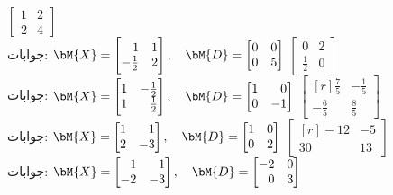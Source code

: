  \quad 
$\begin{bmatrix} 1&2\\2&4 \end{bmatrix}$\\
جوابات:
$\bM{X}=\begin{bmatrix*}[r] 1&1\\-\tfrac{1}{2}&2 \end{bmatrix*},\quad \bM{D}=\begin{bmatrix*}[r] 0&0\\0&5 \end{bmatrix*}$
\quad
$\begin{bmatrix} 0&2\\\tfrac{1}{2}&0 \end{bmatrix}$\\
جوابات:
$\bM{X}=\begin{bmatrix*}[r] 1&-\tfrac{1}{2}\\1&\tfrac{1}{2} \end{bmatrix*},\quad \bM{D}=\begin{bmatrix*}[r] 1&0\\0&-1 \end{bmatrix*}$
\quad
$\begin{bmatrix*}[r] \tfrac{7}{5}&-\tfrac{1}{5}\\[0.25em] -\tfrac{6}{5}&\tfrac{8}{5} \end{bmatrix*}$\\
جوابات:
$\bM{X}=\begin{bmatrix*}[r] 1&1\\2&-3 \end{bmatrix*},\quad \bM{D}=\begin{bmatrix*}[r] 1&0\\0&2 \end{bmatrix*}$
\quad
$\begin{bmatrix*}[r] -12&-5\\ 30&13 \end{bmatrix*}$\\
جوابات:
$\bM{X}=\begin{bmatrix*}[r] 1&1\\-2&-3 \end{bmatrix*},\quad \bM{D}=\begin{bmatrix*}[r] -2&0\\0&3 \end{bmatrix*}$
